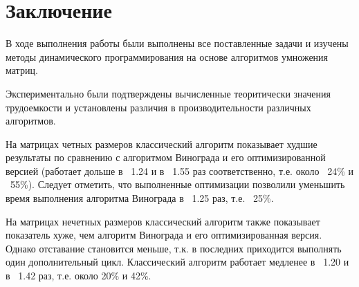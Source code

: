 \chapter*{Заключение}

В ходе выполнения работы были выполнены все поставленные задачи и изучены методы динамического программирования на основе алгоритмов умножения матриц.

Экспериментально были подтверждены вычисленные теоритически значения трудоемкости и установлены различия в производительности различных алгоритмов.

На матрицах четных размеров классический алгоритм показывает худшие результаты по сравнению с алгоритмом Винограда и его оптимизированной версией (работает дольше в ~1.24 и в ~1.55 раз соответственно, т.е. около ~24\% и ~55\%). Следует отметить, что выполненные оптимизации позволили уменьшить время выполнения алгоритма Винограда в ~1.25 раз, т.е. ~25\%.

На матрицах нечетных размеров классический алгоритм также показывает показатель хуже, чем алгоритм Винограда и его оптимизированная версия. Однако отставание становится меньше, т.к. в последних приходится выполнять один дополнительный цикл. Классический алгоритм работает медленее в ~1.20 и в ~1.42 раз, т.е. около 20\% и 42\%.